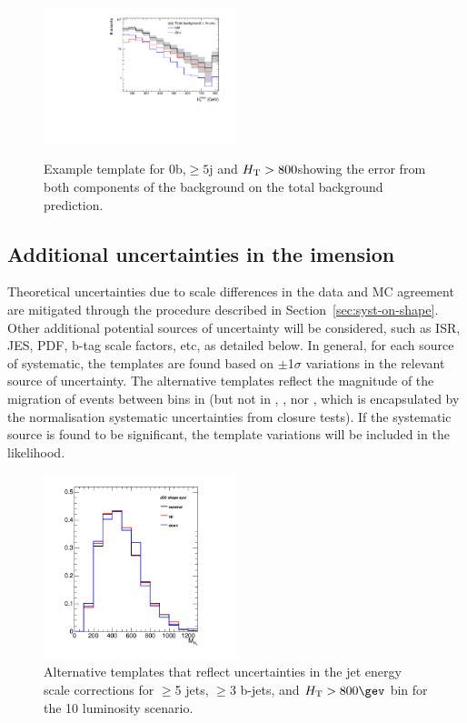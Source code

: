 \begin{figure}[h!]
  \centering
  \includegraphics[width=0.5\textwidth]{figures/template/exampleTemplate13TeV.pdf}
  \\
  \caption{\label{fig:exampleTemplate13} Example template for 0b,$\ge5$j and $\mbox{$H_\text{T}$} > 800$\GeV showing the error from both
components of the background on the total background prediction.}
  
\end{figure}

\subsection{Additional uncertainties in the \texorpdfstring{\mht} dimension}
\label{sec:addMhtUnc}
Theoretical uncertainties due to scale differences in the data and MC agreement 
are mitigated through the procedure described in
Section~\ref{sec:syst-on-shape}. Other additional potential 
sources of uncertainty will be considered, such as
ISR, JES, PDF, b-tag scale factors, etc, as detailed below. In
general, for each source of systematic, the \mht templates are found
based on $\pm$1$\sigma$ variations in the relevant source of
uncertainty. The alternative templates reflect the magnitude of the
migration of events between bins in \mht (but not in \njet, \nb, nor
\scalht, which is encapsulated by the normalisation systematic
uncertainties from closure tests). If the systematic source is found
to be significant, the template variations will be included in the
likelihood. 

\begin{figure}[]
  \centering
  \includegraphics[width=0.5\textwidth]{figures/closureTests/mhtJetSyst_SMS_T1bbbb_2J_mGl1000_mLSP900_JEC_ge3b_ge5j_800_1600.png}
  \caption{\label{fig:jec-shape} Alternative \mht templates that
    reflect uncertainties in the jet energy scale corrections for
    $\geq$5 jets, $\geq$3 b-jets, and $\scalht > 800\gev$ bin for the
    10 \ifb luminosity scenario.}
\end{figure}

